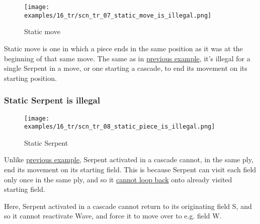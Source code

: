 \vspace*{-0.7\baselineskip}
\noindent
\begin{wrapfigure}[8]{l}{0.4\textwidth}
\centering
\texttt{[image: examples/16\_tr/scn\_tr\_07\_static\_move\_is\_illegal.png]}
\caption{Static move}
\label{fig:scn_tr_07_static_move_is_illegal}
\end{wrapfigure}
Static move is one in which a piece ends in the same position as it was at the
beginning of that same move. The same as in
\hyperref[fig:scn_mv_053_static_move_is_illegal_init]{previous example}, it's
illegal for a single Serpent in a move, or one starting a cascade, to end its
movement on its starting position.


\vspace*{1.7\baselineskip}
\subsubsection*{Static Serpent is illegal}
\label{sec:Tamoanchan Revisited/Serpent/Movement/Static Serpent is illegal}

\vspace*{-0.7\baselineskip}
\noindent
\begin{wrapfigure}[13]{l}{0.4\textwidth}
\centering
\texttt{[image: examples/16\_tr/scn\_tr\_08\_static\_piece\_is\_illegal.png]}
\caption{Static Serpent}
\label{fig:scn_tr_08_static_piece_is_illegal}
\end{wrapfigure}
Unlike
\hyperref[fig:scn_mv_055_static_piece_is_legal_init]{previous example}, Serpent
activated in a cascade cannot, in the same ply, end its movement on its starting
field. \newline
\indent
This is because Serpent can visit each field only once in the same ply, and so it
\hyperref[fig:scn_tr_06_serpent_loop_illegal]{cannot loop back} onto already
visited starting field.

Here, Serpent activated in a cascade cannot return to its originating field S,
and so it cannot reactivate Wave, and force it to move over to e.g. field W.

